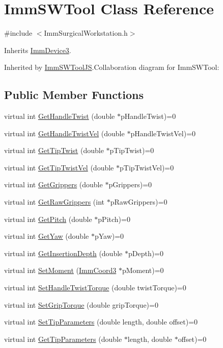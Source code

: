 \hypertarget{classImmSWTool}{
\section{ImmSWTool Class Reference}
\label{classImmSWTool}
}


{\ttfamily \#include $<$ImmSurgicalWorkstation.h$>$}

Inherits \hyperlink{classImmDevice3}{ImmDevice3}.

Inherited by \hyperlink{classImmSWToolJS}{ImmSWToolJS}.Collaboration diagram for ImmSWTool:\subsection*{Public Member Functions}
\begin{DoxyCompactItemize}
\item 
virtual int \hyperlink{classImmSWTool_a69273959bd275761a2a8fa977aa5e143}{GetHandleTwist} (double $\ast$pHandleTwist)=0
\item 
virtual int \hyperlink{classImmSWTool_a4c7a89a86b16049db4a188948622b995}{GetHandleTwistVel} (double $\ast$pHandleTwistVel)=0
\item 
virtual int \hyperlink{classImmSWTool_a7ed10d0817049e1b8915c8a20439592c}{GetTipTwist} (double $\ast$pTipTwist)=0
\item 
virtual int \hyperlink{classImmSWTool_ac33ef554b842b02a5908e53e8234331a}{GetTipTwistVel} (double $\ast$pTipTwistVel)=0
\item 
virtual int \hyperlink{classImmSWTool_ae6e63083a9e1513a7639a27d550e2cf6}{GetGrippers} (double $\ast$pGrippers)=0
\item 
virtual int \hyperlink{classImmSWTool_a3f698e8f0e65e9fa5d4ce2fdd23c3840}{GetRawGrippers} (int $\ast$pRawGrippers)=0
\item 
virtual int \hyperlink{classImmSWTool_a6e0a696c62eb9b0ee26bbc81d22f1265}{GetPitch} (double $\ast$pPitch)=0
\item 
virtual int \hyperlink{classImmSWTool_a1f6c1a17ab9adf4dc6ee5fbb7587887e}{GetYaw} (double $\ast$pYaw)=0
\item 
virtual int \hyperlink{classImmSWTool_ad51506f94f40337033fb62afd199005b}{GetInsertionDepth} (double $\ast$pDepth)=0
\item 
virtual int \hyperlink{classImmSWTool_a2a20a7a1eacb97d9bf48044ca944b73c}{SetMoment} (\hyperlink{structImmCoord3}{ImmCoord3} $\ast$pMoment)=0
\item 
virtual int \hyperlink{classImmSWTool_a0cc829cca7970ef4d58e93f9e5553cd3}{SetHandleTwistTorque} (double twistTorque)=0
\item 
virtual int \hyperlink{classImmSWTool_acec85d7293923fd5acf507da0788ee15}{SetGripTorque} (double gripTorque)=0
\item 
virtual int \hyperlink{classImmSWTool_a80efdbd8d40aaf6a76ec5989a5e47b92}{SetTipParameters} (double length, double offset)=0
\item 
virtual int \hyperlink{classImmSWTool_afa3068b7a4575c255654378134f524c0}{GetTipParameters} (double $\ast$length, double $\ast$offset)=0
\end{DoxyCompactItemize}


